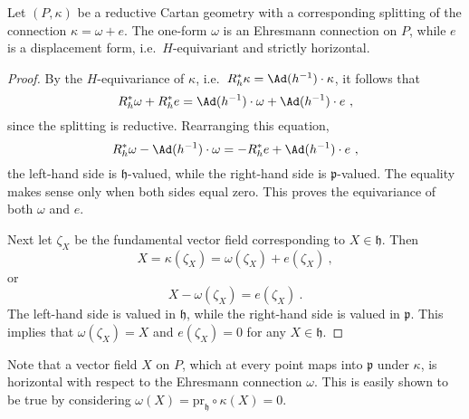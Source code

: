 \documentclass[11pt]{article}
\begin{document}
\begin{proposition}
	Let $(P,\kappa)$ be a reductive Cartan geometry with a 
	corresponding splitting of the connection $\kappa = \omega + 
	e$. The one-form $\omega$ is an Ehresmann connection on $P$, 
	while $e$ is a displacement form, i.e.~$H$-equivariant and 
	strictly horizontal.
\end{proposition}
\begin{proof}
	By the $H$-equivariance of $\kappa$, i.e.~$R_h^\ast \kappa = 
	\Ad(h^{-1})\cdot\kappa$, it follows that
	\begin{displaymath}
		R_h^\ast\omega + R_h^\ast e = \Ad(h^{-1}) \cdot \omega + 
		\Ad(h^{-1}) \cdot e~,
	\end{displaymath}
	since the splitting is reductive.
	Rearranging this equation,
	\begin{displaymath}
		R_h^\ast \omega - \Ad(h^{-1}) \cdot \omega = -R_h^\ast e + 
		\Ad(h^{-1}) \cdot e~,
	\end{displaymath}
	the left-hand side is $\mathfrak{h}$-valued, while the     
	right-hand side is $\mathfrak{p}$-valued. The equality makes 
	sense only when both sides equal zero. This proves the 
	equivariance of both $\omega$ and $e$.
	
	Next let $\zeta_X$ be the fundamental vector field 
	corresponding to $X \in \mathfrak{h}$. Then
	\begin{displaymath}
		X = \kappa(\zeta_X) = \omega(\zeta_X) + e(\zeta_X)~,
	\end{displaymath}
	or
	\begin{displaymath}
		X - \omega(\zeta_X) = e(\zeta_X)~.
	\end{displaymath}
	The left-hand side is valued in $\mathfrak{h}$, while the 
	right-hand side is valued in $\mathfrak{p}$. This implies that 
	$\omega(\zeta_X) = X$ and $e(\zeta_X) =0$ for any $X \in 
	\mathfrak{h}$.
\end{proof}

Note that a vector field $X$ on $P$, which at every point maps 
into $\mathfrak{p}$ under $\kappa$, is horizontal with respect to 
the Ehresmann connection $\omega$. This is easily shown to be 
true by considering $\omega(X) = \mathrm{pr}_\mathfrak{h} \circ 
\kappa(X) = 0$. 
\end{document}
